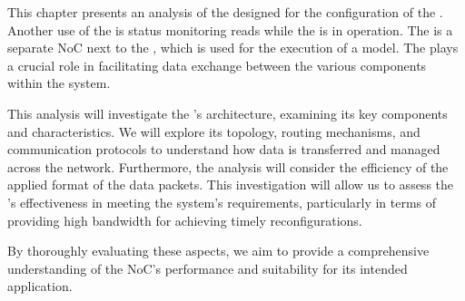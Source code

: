 This chapter presents an analysis of the \confignoc{} designed for the configuration of the \graicore{}.
Another use of the \confignoc{} is status monitoring reads while the \graicore{} is in operation.
The \confignoc{} is a separate NoC next to the \eventnoc{}, which is used for the execution of a model.
The \confignoc{} plays a crucial role in facilitating data exchange between the various components within the system.

This analysis will investigate the \confignoc{}'s architecture, examining its key components and characteristics.
We will explore its topology, routing mechanisms, and communication protocols to understand how data is transferred and managed across the network.
Furthermore, the analysis will consider the efficiency of the applied format of the data packets.  
This investigation will allow us to assess the \confignoc{}'s effectiveness in meeting the system's requirements, particularly in terms of providing high bandwidth for achieving timely reconfigurations.

By thoroughly evaluating these aspects, we aim to provide a comprehensive understanding of the NoC's performance and suitability for its intended application.

